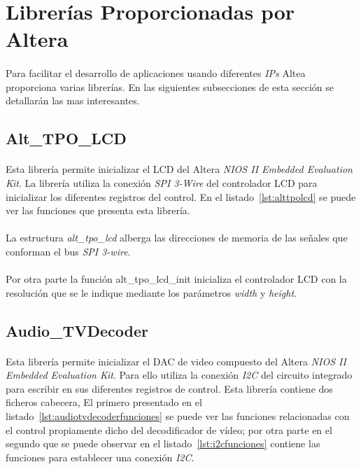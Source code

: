 \documentclass[a4paper,12pt,titlepage,final]{book}
\begin{document}
\section{Librerías Proporcionadas por Altera}
\paragraph{}
Para facilitar el desarrollo de aplicaciones usando diferentes \textit{IPs} Altea proporciona varias librerías. En las siguientes subsecciones de esta sección se detallarán las mas interesantes.
\subsection{Alt\_TPO\_LCD}

\paragraph{}
Esta librería permite inicializar el LCD del Altera \textit{NIOS II Embedded Evaluation Kit}. La librería utiliza la conexión \textit{SPI 3-Wire} del controlador LCD para inicializar los diferentes registros del control. En el listado~\ref{lst:alttpolcd} se puede ver las funciones que presenta esta librería.



\paragraph{}
La estructura \textit{alt\_tpo\_lcd} alberga las direcciones de memoria de las señales que conforman el bus \textit{SPI 3-wire}.

\paragraph{}
Por otra parte la función alt\_tpo\_lcd\_init inicializa el controlador LCD con la resolución que se le indique mediante los parámetros \textit{width} y \textit{height}.

\subsection{Audio\_TVDecoder}
\paragraph{}
Esta librería permite inicializar el DAC de video compuesto del Altera \textit{NIOS II Embedded Evaluation Kit}. Para ello utiliza la conexión \textit{I2C} del circuito integrado para escribir en sus diferentes registros de control. Esta librería contiene dos ficheros cabecera, El primero presentado en el listado~\ref{lst:audiotvdecoderfunciones} se puede ver las funciones relacionadas con el control propiamente dicho del decodificador de vídeo; por otra parte en el segundo que se puede observar en el listado~\ref{lst:i2cfunciones} contiene las funciones para establecer una conexión \textit{I2C}.
\end{document}
